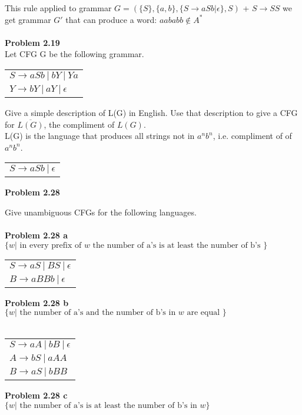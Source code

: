 \documentclass{article}
\newcommand\curl[1]{\{#1\}}
\newcommand{\problem}[1]{\large{\textbf{Problem #1} \\}}
\begin{document}
This rule applied to grammar $G = (\curl{S},\curl{a,b},\curl{S\rightarrow aSb | \epsilon},S)$ + $S\rightarrow SS$ we get grammar $G'$
that can produce a word:
$aababb \notin A^*$ \\ \\

\problem{2.19}
Let  CFG G be the following grammar.
\begin{table}[h!]
\centering
\begin{tabular}{l}
$S \rightarrow a S b\: | \:b Y \:|\: Y a $\\
$Y \rightarrow b Y \:| \:a Y \:| \:\epsilon$
\end{tabular}
\end{table}

Give a simple description of L(G) in English. Use that description to give a CFG for $\overline{L(G)}$, the compliment of $L(G)$. \\

L(G) is the language that produces all strings not in $a^nb^n$, i.e. compliment of of $a^nb^n$.

\begin{table}[h!]
\centering
\begin{tabular}{l}
$S \rightarrow a S b\: | \: \epsilon$
\end{tabular}
\end{table}

\problem{2.28}

Give unambiguous CFGs for the following languages.\\ \\
\problem{2.28 a}
$\{w| \text{ in every prefix of } w \text{ the number of a's is at least the number of b's }\}$

\begin{table}[h!]
\centering
\begin{tabular}{l}
$S \rightarrow a S\: | \:B S \:|\: \epsilon $\\
$B \rightarrow a BB b \: | \: \epsilon$\\
\end{tabular}
\end{table}

\problem{2.28 b}
$\{w| \text{ the number of a's and the number of b's in } w \text{ are equal }\}$ \\ \\

\begin{table}[h!]
\centering
\begin{tabular}{l}
$S \rightarrow a A\: | \:b B \:|\: \epsilon $\\
$A \rightarrow b S \:| \:a AA $ \\
$B \rightarrow a S \:| \:b BB $ \\
\end{tabular}
\end{table}
\problem{2.28 c}
$\{w| \text{ the number of a's is at least the number of b's in } w\}$
\end{document}
